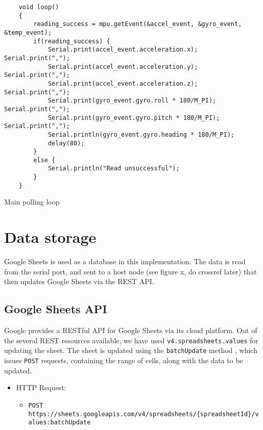 \documentclass[./main.tex]{subfiles}
\begin{document}
\begin{code}
    \begin{verbatim}
    void loop()
    {
        reading_success = mpu.getEvent(&accel_event, &gyro_event, &temp_event);
        if(reading_success) {
            Serial.print(accel_event.acceleration.x); Serial.print(",");
            Serial.print(accel_event.acceleration.y); Serial.print(",");
            Serial.print(accel_event.acceleration.z); Serial.print(",");
            Serial.print(gyro_event.gyro.roll * 180/M_PI); Serial.print(",");
            Serial.print(gyro_event.gyro.pitch * 180/M_PI); Serial.print(",");
            Serial.println(gyro_event.gyro.heading * 180/M_PI);
            delay(80);
        }
        else {
            Serial.println("Read unsuccessful");
        }
    }
    \end{verbatim}
    \caption{Main polling loop}
    \label{code:ucloop}
\end{code}
\vspace{0.5cm}

\section{Data storage}
Google Sheets is used as a database in this implementation. The data is read
from the serial port, and sent to a host node (see figure x, do crossref later)
that then updates Google Sheets via the REST API.

\subsection{Google Sheets API}
Google provides a RESTful API for Google Sheets via its cloud platform. Out of
the several REST resources available, we have used
\texttt{v4.spreadsheets.values} for updating the sheet. The sheet is
updated using the \texttt{batchUpdate} method \cite{gsheetapi}, which issues
\texttt{POST} requests, containing the range of cells, along with the
data to be updated.

\begin{itemize}
    \item HTTP Request:
        \begin{itemize}
            \item {\small \texttt{POST https://sheets.googleapis.com/v4/spreadsheets/\{spreadsheetId\}/values:batchUpdate}}
        \end{itemize}
\end{itemize}
\end{document}
